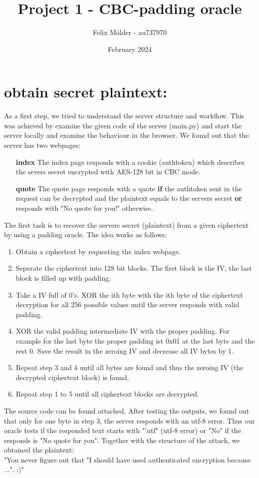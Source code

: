 \documentclass{article}
\title{Project 1 - CBC-padding oracle}
\author{Felix Mölder - au737970}
\date{February 2024}
\begin{document}
\maketitle

\section{obtain secret plaintext:}

As a first step, we tried to understand the server structure and workflow. This was achieved by examine the given code of the server (main.py) and start the server locally and examine the behaviour in the browser. We found out that the server has two webpages:
\begin{itemize}
    \item[\textbf{index}] The index page responds with a cookie (authtoken) which describes the severs secret encrypted with AES-128 bit in CBC mode. 
    \item[\textbf{quote}] The quote page responds with a quote \textbf{if} the authtoken sent in the request can be decrypted and the plaintext equals to the servers secret \textbf{or} responds with "No quote for you!" otherwise.   
\end{itemize}
The first task is to recover the servers secret (plaintext) from a given ciphertext by using a padding oracle. The idea works as follows:
\begin{enumerate}
    \item Obtain a ciphertext by requesting the index webpage.
    \item Seperate the ciphertext into 128 bit blocks. The first block is the IV, the last block is filled up with padding.
    \item Take a IV full of 0's. XOR the ith byte with the ith byte of the ciphertext decryption for all 256 possible values until the server responds with valid padding.
    \item XOR the valid padding intermediate IV with the proper padding. For example for the last byte the proper padding ist 0x01 at the last byte and the rest 0. Save the result in the zeroing IV and decrease all IV bytes by 1.
    \item Repeat step 3 and 4 until all bytes are found and thus the zeroing IV (the decrypted ciphertext block) is found.
    \item Repeat step 1 to 5 until all ciphertext blocks are decrypted. 
\end{enumerate}
The source code can be found attached. After testing the outputs, we found out that only for one byte in step 3, the server responds with an utf-8 error. Thus our oracle tests if the responded text starts with "'utf" (utf-8 error) or "No" if the responds is "No quote for you". Together with the structure of the attack, we obtained the plaintext:\\
"You never figure out that "I should have used authenticated encryption because ...". :)"
\end{document}
